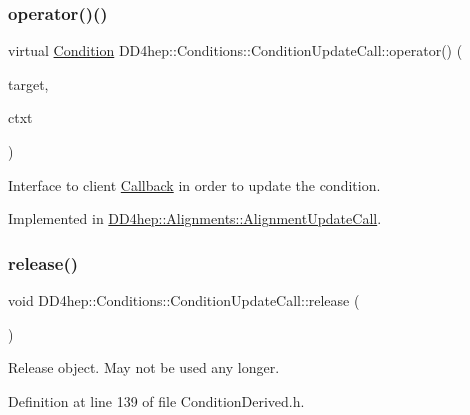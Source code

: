 \subsubsection{\texorpdfstring{operator()()}{operator()()}}
{\footnotesize\ttfamily virtual \hyperlink{class_d_d4hep_1_1_conditions_1_1_condition}{Condition} D\+D4hep\+::\+Conditions\+::\+Condition\+Update\+Call\+::operator() (\begin{DoxyParamCaption}\item[{const \hyperlink{class_d_d4hep_1_1_conditions_1_1_condition_key}{Condition\+Key} \&}]{target,  }\item[{const \hyperlink{class_d_d4hep_1_1_conditions_1_1_condition_update_call_a96b8a912f3a2ea17f139a5f5dcac7146}{Context} \&}]{ctxt }\end{DoxyParamCaption})\hspace{0.3cm}{\ttfamily [pure virtual]}}



Interface to client \hyperlink{class_d_d4hep_1_1_callback}{Callback} in order to update the condition. 



Implemented in \hyperlink{class_d_d4hep_1_1_alignments_1_1_alignment_update_call_a1180d2f8d62c0607b86c87853c7eeeb5}{D\+D4hep\+::\+Alignments\+::\+Alignment\+Update\+Call}.

\hypertarget{class_d_d4hep_1_1_conditions_1_1_condition_update_call_a6009b30c5c1d14c3c489c84d2042f4fe}{}\label{class_d_d4hep_1_1_conditions_1_1_condition_update_call_a6009b30c5c1d14c3c489c84d2042f4fe} 
\subsubsection{\texorpdfstring{release()}{release()}}
{\footnotesize\ttfamily void D\+D4hep\+::\+Conditions\+::\+Condition\+Update\+Call\+::release (\begin{DoxyParamCaption}{ }\end{DoxyParamCaption})\hspace{0.3cm}{\ttfamily [inline]}}



Release object. May not be used any longer. 



Definition at line 139 of file Condition\+Derived.\+h.



